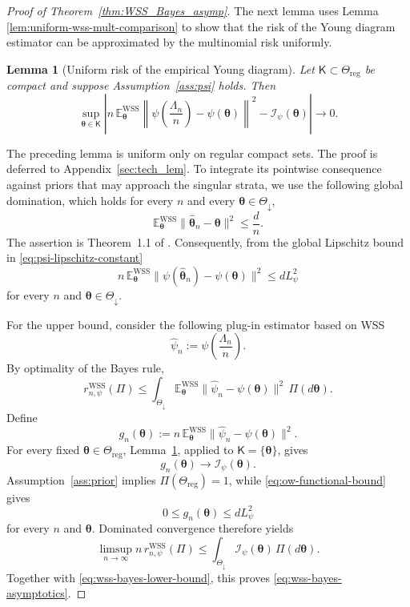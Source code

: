 \documentclass{article}
\newtheorem{lemma}[theorem]{Lemma}
\theoremstyle{named}
\theoremstyle{named1}
\newcommand{\E}{\mathbb{E}}
\newcommand{\WSS}{\mathrm{WSS}}
\newcommand{\btheta}{\boldsymbol{\theta}}
\newcommand{\cI}{\mathcal{I}}
\theoremstyle{plain}
\theoremstyle{remark}
\begin{document}
\begin{proof}[Proof of Theorem~\ref{thm:WSS_Bayes_asymp}]
The next lemma uses Lemma \ref{lem:uniform-wss-mult-comparison} to show that the risk of the Young diagram estimator can be approximated by the multinomial risk uniformly.

\begin{lemma}[Uniform risk of the empirical Young diagram]
\label{lem:uniform-wss-functional-risk}
Let \(\mathsf K\subset\Theta_{\mathrm{reg}}\) be compact and suppose
Assumption~\ref{ass:psi} holds. Then
\[
    \sup_{\btheta\in\mathsf K}
    \left|
        n\,\E_{\btheta}^{\WSS}
        \left\|
            \psi\!\left(\frac{\Lambda_n}{n}\right)
            -\psi(\btheta)
        \right\|^2
        -\cI_\psi(\btheta)
    \right|
    \rightarrow0.
\]
\end{lemma}




The preceding lemma is uniform only on regular compact sets. The proof is deferred to Appendix~\ref{sec:tech_lem}. To
integrate its pointwise consequence against priors that may approach
the singular strata, we use the following global domination, which holds for every \(n\) and every \(\btheta\in\Theta_{\downarrow}\),
\begin{equation}
    \E_{\btheta}^{\WSS}
      \|\widehat{\btheta}_n-\btheta\|^2
    \leq\frac dn.
\label{eq:ow-spectrum-bound}
\end{equation}
The assertion is Theorem~1.1 of
\cite{odonnell2016efficient}.
Consequently, from the global
Lipschitz bound in \eqref{eq:psi-lipschitz-constant}
\begin{equation}
    n\,\E_{\btheta}^{\WSS}
    \|\psi(\widehat{\btheta}_n)-\psi(\btheta)\|^2
    \leq dL_\psi^2
\label{eq:ow-functional-bound}
\end{equation}
for every \(n\) and \(\btheta\in\Theta_{\downarrow}\).

For the upper bound, consider the following plug-in estimator based on WSS
\[
    \widehat\psi_n:=\psi\!\left(\frac{\Lambda_n}{n}\right).
\]
By optimality of the Bayes rule,
\[
    r_{n,\psi}^{\WSS}(\Pi)
    \leq
    \int_{\Theta_{\downarrow}}
      \E_{\btheta}^{\WSS}
      \|\widehat\psi_n-\psi(\btheta)\|^2
      \,\Pi(d\btheta).
\]
Define
\[
    g_n(\btheta)
    :=n\,\E_{\btheta}^{\WSS}
      \|\widehat\psi_n-\psi(\btheta)\|^2.
\]
For every fixed \(\btheta\in\Theta_{\mathrm{reg}}\),
Lemma~\ref{lem:uniform-wss-functional-risk}, applied to
\(\mathsf K=\{\btheta\}\), gives
\[
    g_n(\btheta)\rightarrow\cI_\psi(\btheta).
\]
Assumption~\ref{ass:prior} implies
\(\Pi(\Theta_{\mathrm{reg}})=1\), while \eqref{eq:ow-functional-bound} gives
\[
    0\leq g_n(\btheta)\leq dL_\psi^2
\]
for every \(n\) and \(\btheta\). Dominated convergence therefore
yields
\[
    \limsup_{n\to\infty}n\,r_{n,\psi}^{\WSS}(\Pi)
    \leq
    \int_{\Theta_{\downarrow}}
      \cI_\psi(\btheta)\,\Pi(d\btheta).
\]
Together with \eqref{eq:wss-bayes-lower-bound}, this proves
\eqref{eq:wss-bayes-asymptotics}.
\end{proof}
\end{document}
